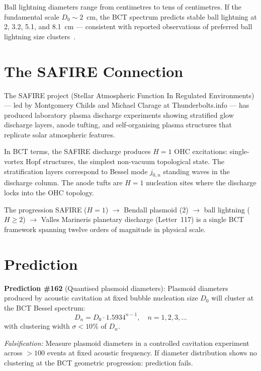 \documentclass[12pt,twocolumn]{article}
\begin{document}
Ball lightning diameters range from centimetres to tens of
centimetres. If the fundamental scale $D_0 \sim 2$~cm, the
BCT spectrum predicts stable ball lightning at 2, 3.2, 5.1,
and 8.1~cm --- consistent with reported observations of
preferred ball lightning size clusters~\cite{Stenhoff1999}.

\section{The SAFIRE Connection}

The SAFIRE project (Stellar Atmospheric Function In Regulated
Environments) --- led by Montgomery Childs and Michael Clarage
at Thunderbolts.info --- has produced laboratory plasma
discharge experiments showing stratified glow discharge layers,
anode tufting, and self-organising plasma structures that
replicate solar atmospheric features.

In BCT terms, the SAFIRE discharge produces $H = 1$ OHC
excitations: single-vortex Hopf structures, the simplest
non-vacuum topological state. The stratification layers
correspond to Bessel mode $j_{0,n}$ standing waves in the
discharge column. The anode tufts are $H = 1$ nucleation
sites where the discharge locks into the OHC topology.

The progression SAFIRE ($H=1$) $\to$ Bendall plasmoid (2)
$\to$ ball lightning ($H \geq 2$) $\to$ Valles Marineris
planetary discharge (Letter~117) is a single BCT framework
spanning twelve orders of magnitude in physical scale.

\section{Prediction}

\noindent\textbf{Prediction \#162} (Quantised plasmoid diameters):
Plasmoid diameters produced by acoustic cavitation at fixed
bubble nucleation size $D_0$ will cluster at the BCT Bessel
spectrum:
\begin{equation}
  D_n = D_0 \cdot 1.5934^{n-1}, \quad n = 1, 2, 3, \ldots
\end{equation}
with clustering width $\sigma < 10\%$ of $D_n$.

\textit{Falsification:} Measure plasmoid diameters in a
controlled cavitation experiment across $>100$ events at
fixed acoustic frequency. If diameter distribution shows
no clustering at the BCT geometric progression: prediction
fails.
\end{document}
